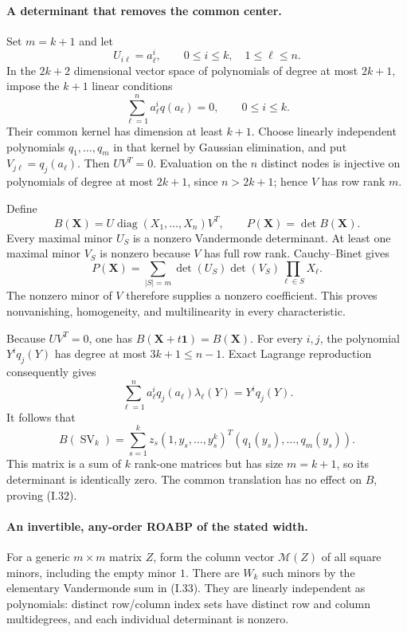 \paragraph{A determinant that removes the common center.}
Set $m=k+1$ and let
\[
 U_{i\ell}=a_\ell^i,\qquad 0\le i\le k,\quad1\le\ell\le n.
\]
In the $2k+2$ dimensional vector space of polynomials of degree
at most $2k+1$, impose the $k+1$ linear conditions
\[
 \sum_{\ell=1}^n a_\ell^i q(a_\ell)=0,
       \qquad0\le i\le k.
\]
Their common kernel has dimension at least $k+1$.
Choose linearly independent polynomials
$q_1,\ldots,q_m$ in that kernel by Gaussian elimination, and
put $V_{j\ell}=q_j(a_\ell)$.  Then $UV^T=0$.
Evaluation on the $n$ distinct nodes is injective on polynomials
of degree at most $2k+1$, since $n>2k+1$; hence $V$ has row
rank $m$.

Define
\[
 B(\mathbf X)=U\operatorname{diag}(X_1,\ldots,X_n)V^T,
 \qquad P(\mathbf X)=\det B(\mathbf X).
 \tag{I.34}
\]
Every maximal minor $U_S$ is a nonzero Vandermonde determinant.
At least one maximal minor $V_S$ is nonzero because $V$ has
full row rank.  Cauchy--Binet gives
\[
 P(\mathbf X)=\sum_{|S|=m}\det(U_S)\det(V_S)
                                  \prod_{\ell\in S}X_\ell.
\]
The nonzero minor of $V$ therefore supplies a nonzero coefficient.
This proves nonvanishing, homogeneity, and multilinearity in
every characteristic.

Because $UV^T=0$, one has $B(\mathbf X+t\mathbf1)=B(\mathbf X)$.
For every $i,j$, the polynomial $Y^i q_j(Y)$ has degree at most
$3k+1\le n-1$.  Exact Lagrange reproduction consequently gives
\[
 \sum_{\ell=1}^n a_\ell^i q_j(a_\ell)\lambda_\ell(Y)
    =Y^i q_j(Y).
\]
It follows that
\[
 B(\operatorname{SV}_k)
   =\sum_{s=1}^k z_s
       (1,y_s,\ldots,y_s^k)^T
       (q_1(y_s),\ldots,q_m(y_s)).
\]
This matrix is a sum of $k$ rank-one matrices but has size
$m=k+1$, so its determinant is identically zero.  The common
translation has no effect on $B$, proving (I.32).

\paragraph{An invertible, any-order ROABP of the stated width.}
For a generic $m\times m$ matrix $Z$, form the column vector
$\mathcal M(Z)$ of all square minors, including the empty
minor $1$.  There are $W_k$ such minors by the elementary
Vandermonde sum in (I.33).  They are linearly independent as
polynomials: distinct row/column index sets have distinct
row and column multidegrees, and each individual determinant
is nonzero.


